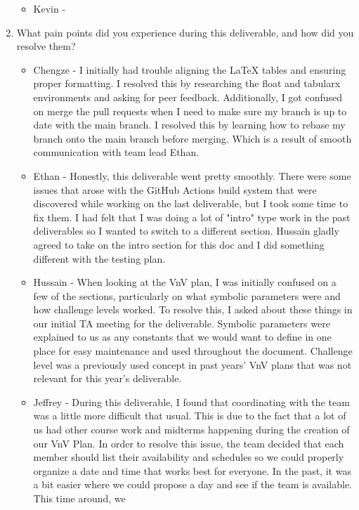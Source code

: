 \documentclass[12pt, titlepage]{article}
\begin{document}
\begin{enumerate}
\begin{itemize}
    \item Kevin -
  \end{itemize}
  \item What pain points did you experience during this deliverable, and how
    did you resolve them?
  \begin{itemize}
    \item Chengze - I initially had trouble aligning the LaTeX tables and ensuring proper formatting. I resolved 
    this by researching the float and tabularx environments and asking for peer feedback. Additionally, I got confused 
    on merge the pull requests when I need to make sure my branch is up to date with the main branch. I resolved this by
    learning how to rebase my branch onto the main branch before merging. Which is a result of smooth communication with 
    team lead Ethan.
    \item Ethan - Honestly, this deliverable went pretty smoothly. There were
      some issues that arose with the GitHub Actions build system that were
      discovered while working on the last deliverable, but I took some time to
      fix them. I had felt that I was doing a lot of "intro" type work in the
      past deliverables so I wanted to switch to a different section. Hussain
      gladly agreed to take on the intro section for this doc and I did
      something different with the testing plan.
    \item Hussain - When looking at the VnV plan, I was initially confused
    on a few of the sections, particularly on what symbolic parameters were
    and how challenge levels worked. To resolve this, I asked about these
    things in our initial TA meeting for the deliverable. Symbolic parameters
    were explained to us as any constants that we would want to define in one
    place for easy maintenance and used throughout the document. Challenge
    level was a previously used concept in past years' VnV plans that was
    not relevant for this year's deliverable.
    \item Jeffrey - During this deliverable, I found that coordinating with
      the team was a little more difficult that usual. This is due to the fact
      that a lot of us had other course work and midterms happening during
      the creation of our VnV Plan. In order to resolve this issue, the team
      decided that each member should list their availability and schedules
      so we could properly organize a date and time that works best for
      everyone. In the past, it was a bit easier where we could
      propose a day and see if the team is available. This time around, we

\end{itemize}
\end{enumerate}
\end{document}
